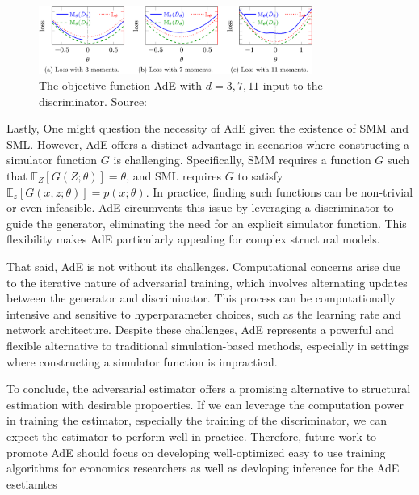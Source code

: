 \documentclass[12pt]{article}
\begin{document}
\begin{figure}
    \centering
    \includegraphics[width=0.8\textwidth]{../Figures/SMM_AdE.png}
    \caption{The objective function AdE with $d=3,7,11$ input to the discriminator. Source: \citet{kaji2023adversarial}}
    \label{fig:SMM_AdE}
\end{figure}

Lastly, One might question the necessity of AdE given the existence of SMM and
SML. However, AdE offers a distinct advantage in scenarios where constructing a
simulator function \(G\) is challenging. Specifically, SMM requires a function
\(G\) such that \(\mathbb{E}_Z[G(Z; \theta)] = \theta\), and SML requires \(G\)
to satisfy \(\mathbb{E}_z[G(x, z; \theta)] = p(x; \theta)\). In practice,
finding such functions can be non-trivial or even infeasible. AdE circumvents
this issue by leveraging a discriminator to guide the generator, eliminating
the need for an explicit simulator function. This flexibility makes AdE
particularly appealing for complex structural models.

That said, AdE is not without its challenges. Computational concerns arise due
to the iterative nature of adversarial training, which involves alternating
updates between the generator and discriminator. This process can be
computationally intensive and sensitive to hyperparameter choices, such as the
learning rate and network architecture. Despite these challenges, AdE
represents a powerful and flexible alternative to traditional simulation-based
methods, especially in settings where constructing a simulator function is
impractical.

To conclude, the adversarial estimator offers a promising alternative to
structural estimation with desirable propoerties. If we can leverage the
computation power in training the estimator, especially the training of the
discriminator, we can expect the estimator to perform well in practice.
Therefore, future work to promote AdE should focus on developing well-optimized
easy to use training algorithms for economics researchers as well as devloping
inference for the AdE esetiamtes





\pagebreak
\newpage

\end{document}
